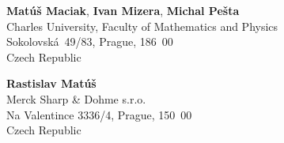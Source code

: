 

\smallskip

\parbox[t]{0.60\textwidth}{
  \textbf{Matúš Maciak}, \textbf{Ivan Mizera}, \textbf{Michal Pešta} \\[0.1cm]
  Charles University, Faculty of Mathematics and Physics\\
  Sokolovská~49/83, Prague, 186~00\\
  Czech Republic\\[0.1cm]
}
\hfill
\parbox[t]{0.40\textwidth}{
  \textbf{Rastislav Matúš} \\[0.1cm]
  Merck Sharp \& Dohme s.r.o.\\
  Na Valentince 3336/4, Prague, 150~00\\
  Czech Republic\\[0.1cm]
}
